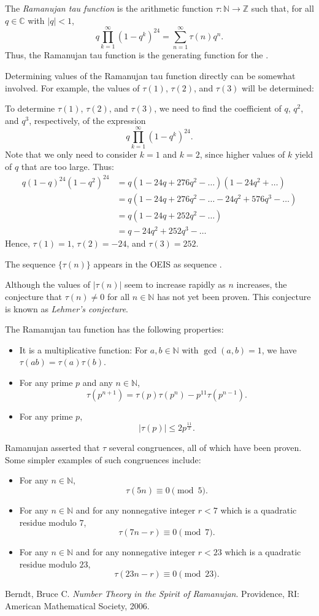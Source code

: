 \documentclass[12pt]{article}
\begin{document}
The \emph{Ramanujan tau function} is the arithmetic function $\tau\colon\mathbb{N}\to\mathbb{Z}$ such that, for all $q\in\mathbb{C}$ with $|q|<1$,
\[
q\prod_{k=1}^{\infty}(1-q^k)^{24}=\sum_{n=1}^{\infty} \tau(n)q^n.
\]
Thus, the Ramanujan tau function is the generating function for the .

Determining values of the Ramanujan tau function directly can be somewhat involved.  For example, the values of $\tau(1)$, $\tau(2)$, and $\tau(3)$ will be determined:

To determine $\tau(1)$, $\tau(2)$, and $\tau(3)$, we need to find the coefficient of $q$, $q^2$, and $q^3$, respectively, of the expression
\[
q\prod_{k=1}^{\infty}(1-q^k)^{24}.
\]
Note that we only need to consider $k=1$ and $k=2$, since higher values of $k$ yield  of $q$ that are too large.  Thus:
\begin{align*}
q(1-q)^{24}(1-q^2)^{24} & =q(1-24q+276q^2-\dots)(1-24q^2+\dots) \\
& =q(1-24q+276q^2-\dots-24q^2+576q^3-\dots) \\
& =q(1-24q+252q^2-\dots) \\
& =q-24q^2+252q^3-\dots
\end{align*}
Hence, $\tau(1)=1$, $\tau(2)=-24$, and $\tau(3)=252$.

The sequence $\{\tau(n)\}$ appears in the OEIS as sequence .

Although the values of $|\tau(n)|$ seem to increase rapidly as $n$ increases, the conjecture that $\tau(n)\neq 0$ for all $n\in\mathbb{N}$ has not yet been proven.  This conjecture is known as \emph{Lehmer's conjecture}.

The Ramanujan tau function has the following properties:
\begin{itemize}
\item It is a multiplicative function:  For $a,b\in\mathbb{N}$ with $\gcd(a,b)=1$, we have $\tau(ab)=\tau(a)\tau(b)$.
\item For any prime $p$ and any $n\in\mathbb{N}$,
\[
\tau(p^{n+1})=\tau(p)\tau(p^n)-p^{11}\tau(p^{n-1}).
\]
\item For any prime $p$,
\[
|\tau(p)|\le 2p^{\frac{11}{2}}.
\]
\end{itemize}

Ramanujan asserted that $\tau$  several congruences, all of which have been proven.  Some simpler examples of such congruences include:
\begin{itemize}
\item For any $n\in\mathbb{N}$,
\[
\tau(5n)\equiv 0\pmod 5.
\]
\item For any $n\in\mathbb{N}$ and for any nonnegative integer $r<7$ which is a quadratic residue modulo $7$,
\[
\tau(7n-r)\equiv 0\pmod 7.
\]
\item For any $n\in\mathbb{N}$ and for any nonnegative integer $r<23$ which is a quadratic residue modulo $23$,
\[
\tau(23n-r)\equiv 0\pmod{23}.
\]
\end{itemize}

\begin{thebibliography}{9}
 Berndt, Bruce C. \emph{Number Theory in the Spirit of Ramanujan}. Providence, RI: American Mathematical Society, 2006.
\end{thebibliography}
\end{document}
